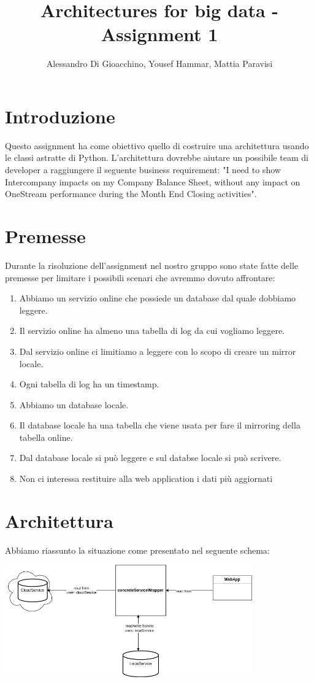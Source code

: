 \documentclass[a4paper]{article}
\title{Architectures for big data - Assignment 1}
\author{Alessandro Di Gioacchino, Yousef Hammar, Mattia Paravisi}
\begin{document}
\maketitle
\newpage

\section{Introduzione}
Questo assignment ha come obiettivo quello di costruire una architettura usando le classi astratte di Python. L'architettura dovrebbe
aiutare un possibile team di developer a raggiungere il seguente business requirement: "I need to show Intercompany impacts on my Company Balance Sheet, without any impact on OneStream
performance during the Month End Closing activities".

\section{Premesse}
Durante la risoluzione dell'assignment nel nostro gruppo sono state fatte delle premesse per limitare i possibili scenari che avremmo dovuto affrontare:
\begin{enumerate}
    \item Abbiamo un servizio online che possiede un database dal quale dobbiamo leggere.
    \item Il servizio online ha almeno una tabella di log da cui vogliamo leggere.
    \item Dal servizio online ci limitiamo a leggere con lo scopo di creare un mirror locale.
    \item Ogni tabella di log ha un timestamp.
    \item Abbiamo un database locale.
    \item Il database locale ha una tabella che viene usata per fare il mirroring della tabella online.
    \item Dal database locale si può leggere e sul databse locale si può scrivere.
    \item Non ci interessa restituire alla web application i dati più aggiornati
\end{enumerate}

\section{Architettura}
Abbiamo riassunto la situazione come presentato nel seguente schema:

\begin{center}
    \includegraphics[width=0.8\textwidth]{imgs/situazioneIniziale.png}
\end{center}
\end{document}
